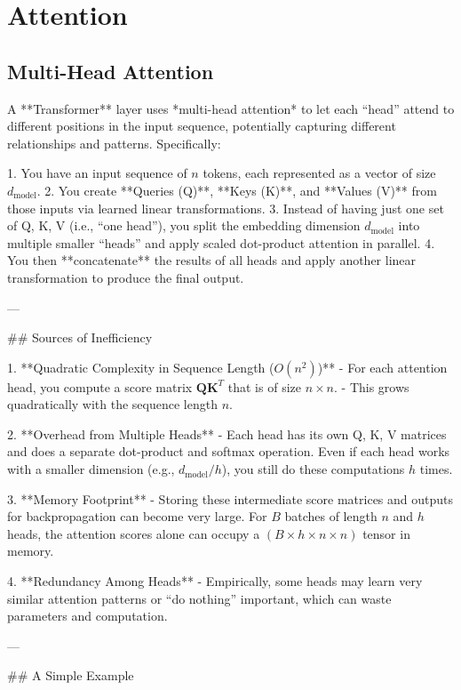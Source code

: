 \chapter{Attention}

\section{Multi-Head Attention}
\label{sec:transformer:mha}

A **Transformer** layer uses *multi-head attention* to let each “head” attend to different positions in the input sequence, potentially capturing different relationships and patterns. Specifically:

1. You have an input sequence of \(n\) tokens, each represented as a vector of size \(d_{\text{model}}\).
2. You create **Queries (Q)**, **Keys (K)**, and **Values (V)** from those inputs via learned linear transformations.
3. Instead of having just one set of Q, K, V (i.e., “one head”), you split the embedding dimension \(d_{\text{model}}\) into multiple smaller “heads” and apply scaled dot-product attention in parallel.
4. You then **concatenate** the results of all heads and apply another linear transformation to produce the final output.

---

## Sources of Inefficiency

1. **Quadratic Complexity in Sequence Length (\(O(n^2)\))**  
   - For each attention head, you compute a score matrix \(\mathbf{Q}\mathbf{K}^T\) that is of size \(n \times n\).  
   - This grows quadratically with the sequence length \(n\).  

2. **Overhead from Multiple Heads**  
   - Each head has its own Q, K, V matrices and does a separate dot-product and softmax operation. Even if each head works with a smaller dimension (e.g., \(d_{\text{model}} / h\)), you still do these computations \(h\) times.  

3. **Memory Footprint**  
   - Storing these intermediate score matrices and outputs for backpropagation can become very large. For \(B\) batches of length \(n\) and \(h\) heads, the attention scores alone can occupy a \((B \times h \times n \times n)\) tensor in memory.  

4. **Redundancy Among Heads**  
   - Empirically, some heads may learn very similar attention patterns or “do nothing” important, which can waste parameters and computation.  

---

## A Simple Example

